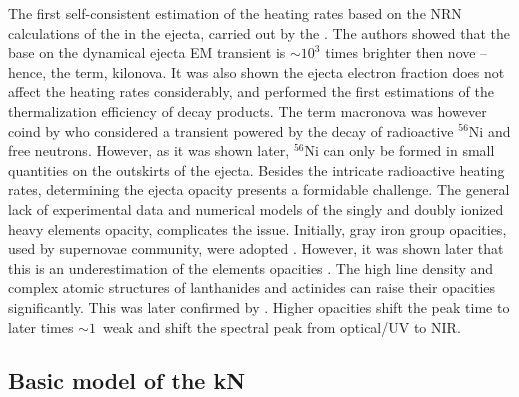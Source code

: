 The first self-consistent estimation of the heating rates based on the \ac{NRN} calculations 
of the \rproc{} in the ejecta, carried out by the \citet{Metzger:2010}. The authors showed that the base 
on the dynamical ejecta \ac{EM} transient is $\sim10^3$ times brighter then nove -- hence, the term, kilonova. 
It was also shown the ejecta electron fraction does not affect the heating rates considerably, 
and performed the first estimations of the thermalization efficiency of decay products. 
%
The term macronova was however coind by \citet{Kulkarni:2005jw} who considered a transient powered by the 
decay of radioactive $^{56}$Ni and free neutrons. However, as it was shown later, $^{56}$Ni can only be 
formed in small quantities on the outskirts of the ejecta.
%
Besides the intricate radioactive heating rates, determining the ejecta opacity presents a 
formidable challenge. The general lack of experimental data and numerical models of the singly 
and doubly ionized heavy \rproc{} elements opacity, complicates the issue. Initially, gray iron 
group opacities, used by supernovae community, were adopted \citep{Roberts:2011}. However, it was 
shown later that this is an underestimation of the \rproc{} elements opacities \citep{Kasen:2013xka}. 
The high line density and complex atomic structures of lanthanides and actinides can raise their 
opacities significantly. This was later confirmed by \citep{Tanaka:2013ana}. Higher opacities shift 
the peak time to later times ${\sim}1$~weak \citep{Barnes:2013wka} 
and shift the spectral peak from optical/UV to \ac{NIR}.


\subsection{Basic model of the \ac{kN}}

